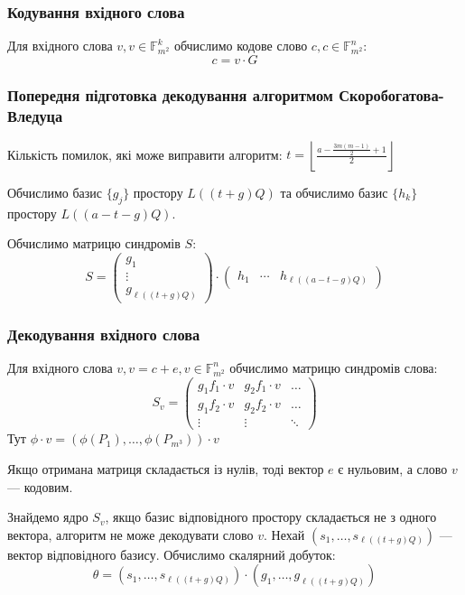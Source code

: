 \documentclass[a4paper,14pt,oneside]{extarticle}
\begin{document}
\subsubsection{Кодування вхідного слова}
Для вхідного слова $v, v\in \mathbb{F}_{m^2}^k$ обчислимо кодове слово $c, c \in \mathbb{F}_{m^2}^n$:
$$c = v \cdot G$$
 
\subsubsection{Попередня підготовка декодування алгоритмом Скоро\-богатова-Вледуца}
Кількість помилок, які може виправити алгоритм: $t = \left \lfloor \frac{a-\frac{3m(m-1)}{2} + 1}{2} \right \rfloor$

Обчислимо базис $\{g_j\}$ простору $L( (t+g)Q )$ та обчислимо базис $\{h_k\}$ простору $L( (a-t-g)Q)$.

Обчислимо матрицю синдромів $S$:
$$
S = 
\begin{pmatrix}
    g_1 \\
    \vdots \\
    g_{\ell( (t+g)Q )}
\end{pmatrix}
\cdot
\begin{pmatrix}
    h_1 & \cdots & h_{\ell( (a-t-g)Q)}
\end{pmatrix}
$$

\subsubsection{Декодування вхідного слова}
Для вхідного слова $v, v=c+e, v \in \mathbb{F}_{m^2}^n$ обчислимо матрицю синдромів слова:
$$
S_v = 
\begin{pmatrix}
    g_1 f_1 \cdot v & g_2 f_1 \cdot v & \dots \\
    g_1 f_2 \cdot v & g_2 f_2 \cdot v & \dots \\
    \vdots & \vdots & \ddots
\end{pmatrix}
$$
Тут $\phi \cdot v = (\phi(P_1), \dots , \phi(P_{m^3})) \cdot v$

Якщо отримана матриця складається із нулів, тоді вектор $e$ є нульовим, а слово $v$ --- кодовим.

Знайдемо ядро $S_v$, якщо базис відповідного простору складається не з одного вектора, алгоритм не може декодувати слово $v$.
Нехай $(s_1, \dots, s_{\ell( (t+g)Q )})$ --- вектор відповідного базису. Обчислимо скалярний добуток:
$$\theta = (s_1, \dots, s_{\ell( (t+g)Q )}) \cdot (g_1, \dots, g_{\ell( (t+g)Q )})$$
\end{document}
